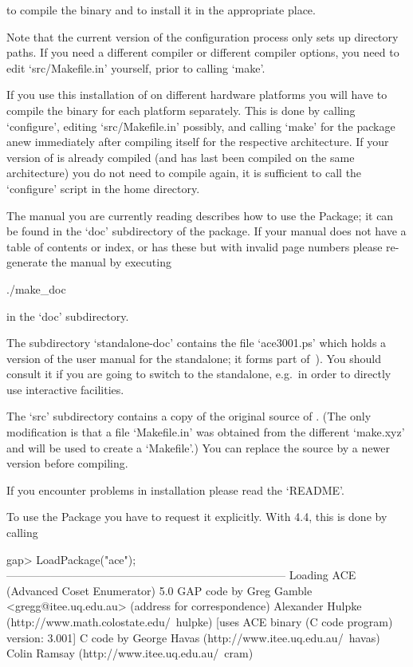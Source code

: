 to compile the binary and to install it in the appropriate place.

Note that the  current version of the configuration  process only sets
up  directory paths.  If you  need a  different compiler  or different
compiler options, you need to edit `src/Makefile.in'  yourself,  prior
to calling `make'.

If you use this installation of {\GAP} on different hardware platforms
you will have to compile the binary for each platform separately. This
is done by calling `configure',  editing  `src/Makefile.in'  possibly,
and calling `make' for the package anew  immediately  after  compiling
{\GAP} itself for the respective  architecture.  If  your  version  of
{\GAP} is already compiled (and has last been  compiled  on  the  same
architecture)  you  do  not  need  to  compile  {\GAP}  again,  it  is
sufficient  to  call  the  `configure'  script  in  the  {\GAP}   home
directory.

The manual you are currently reading describes how to use  the  {\ACE}
Package; it can be found in the `doc' subdirectory of the package.  If
your manual does not have a table of contents or index, or  has  these
but with  invalid  page  numbers  please  re-generate  the  manual  by
executing

\begintt
./make_doc
\endtt

in the `doc' subdirectory.

The subdirectory `standalone-doc' contains the file `ace3001.ps' which
holds a version of the user manual for the {\ACE} standalone; it forms
part of~\cite{Ram99}). You should consult  it  if  you  are  going  to
switch to  the  {\ACE}  standalone,  e.g.~in  order  to  directly  use
interactive facilities.

The  `src' subdirectory  contains a  copy  of the  original source  of
{\ACE}.  (The  only modification  is  that  a  file `Makefile.in'  was
obtained from  the different `make.xyz' and  will be used  to create a
`Makefile'.)  You  can replace  the source by  a newer  version before
compiling.

If you encounter problems in installation please read the `README'.


To use the {\ACE} Package you have  to  request  it  explicitly.  With
{\GAP} 4.4, this is done by calling

\beginexample
gap> LoadPackage("ace");
---------------------------------------------------------------------------
Loading    ACE (Advanced Coset Enumerator) 5.0
GAP code by Greg Gamble <gregg@itee.uq.edu.au> (address for correspondence)
       Alexander Hulpke (http://www.math.colostate.edu/~hulpke)
           [uses ACE binary (C code program) version: 3.001]
C code by  George Havas (http://www.itee.uq.edu.au/~havas)
           Colin Ramsay (http://www.itee.uq.edu.au/~cram)

